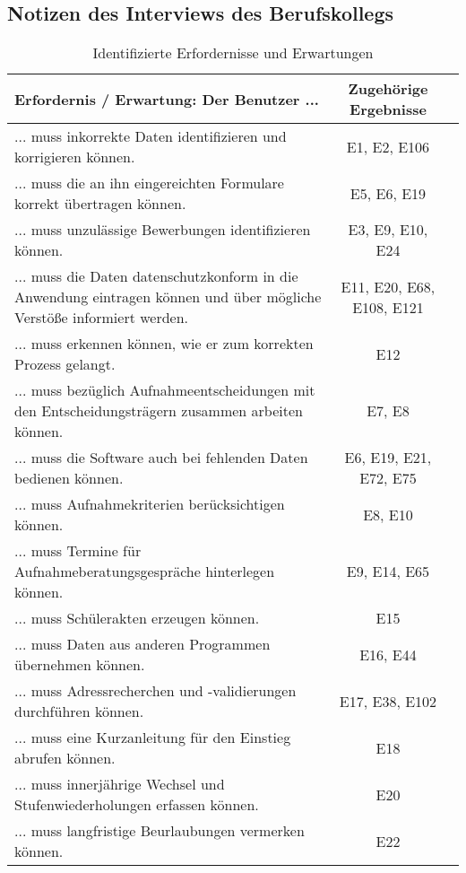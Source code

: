 \subsection{Notizen des Interviews des Berufskollegs}
\label{section-InterviewBerufskolleg}


\begin{landscape}

    \begin{longtable}{p{15cm}cc}
        \caption{Identifizierte Erfordernisse und Erwartungen} \label{tab:mytable} \\
        \toprule
        Erfordernis / Erwartung: Der Benutzer ... & Zugehörige Ergebnisse \\
        \midrule
... muss inkorrekte Daten identifizieren und korrigieren können. & E1, E2, E106 \\
... muss die an ihn eingereichten Formulare korrekt übertragen können. & E5, E6, E19 \\
... muss unzulässige Bewerbungen identifizieren können. & E3, E9, E10, E24 \\
... muss die Daten datenschutzkonform in die Anwendung eintragen können und über mögliche Verstöße informiert werden. & E11, E20, E68, E108, E121 \\
... muss erkennen können, wie er zum korrekten Prozess gelangt. & E12 \\
... muss bezüglich Aufnahmeentscheidungen mit den Entscheidungsträgern zusammen arbeiten können. & E7, E8 \\
... muss die Software auch bei fehlenden Daten bedienen können. & E6, E19, E21, E72, E75 \\
... muss Aufnahmekriterien berücksichtigen können. & E8, E10 \\
... muss Termine für Aufnahmeberatungsgespräche hinterlegen können. & E9, E14, E65 \\
... muss Schülerakten erzeugen können. & E15 \\
... muss Daten aus anderen Programmen übernehmen können. & E16, E44 \\
... muss Adressrecherchen und -validierungen durchführen können. & E17, E38, E102 \\
... muss eine Kurzanleitung für den Einstieg abrufen können. & E18 \\
... muss innerjährige Wechsel und Stufenwiederholungen erfassen können. & E20 \\
... muss langfristige Beurlaubungen vermerken können. & E22 \\

\end{longtable}
\end{landscape}
